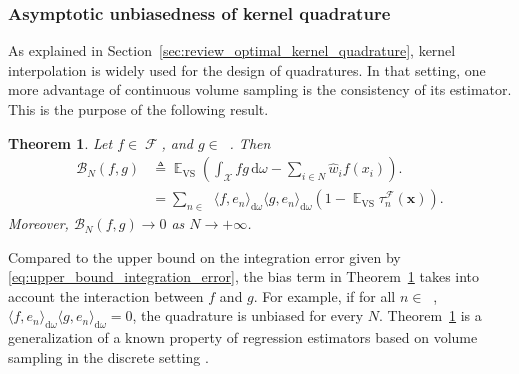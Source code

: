 \documentclass[twoside,11pt]{book}
\newtheorem{theorem}{Theorem}
\numberwithin{theorem}{chapter}
\numberwithin{definition}{chapter}
\numberwithin{proposition}{chapter}
\numberwithin{corollary}{chapter}
\numberwithin{example}{chapter}
\numberwithin{lemma}{chapter}
\DeclareMathOperator{\VS}{\mathrm{VS}}
\DeclareMathOperator{\EX}{\mathbb{E}}
\DeclareMathOperator{\F}{\mathcal{F}}
\DeclareMathOperator{\X}{\mathcal{X}}
\DeclareMathOperator{\Ltwo}{\mathbb{L}_{2}(\mathrm{d} \omega)}
\DeclareMathOperator{\Ns}{\mathbb{N}^{*}}
\newcommand{\pc}[1]{\textcolor{blue}{#1}}
\newcommand{\rb}[1]{\textcolor{magenta}{#1}}
\begin{document}
\subsubsection{Asymptotic unbiasedness of kernel quadrature}\label{sec:unbiased_property}
As explained in Section~\ref{sec:review_optimal_kernel_quadrature}, kernel interpolation is widely used for the design of quadratures.
In that setting, one more advantage of continuous volume sampling is the consistency of its estimator. This is the purpose of the following result.
 \begin{theorem}\label{thm:EX_VS_integration_error}
Let $f \in \F$, and $g \in \Ltwo$. Then
\begin{align}
\mathcal{B}_{N}(f,g) & \triangleq \EX_{\VS} \left( \int_{\X}fg\,\mathrm{d}\omega -  \sum\limits_{i \in N} \hat{w}_{i}f(x_{i}) \right). \nonumber\\
 & = \sum\limits_{n \in \Ns} \langle f,e_{n} \rangle_{\mathrm{d}\omega} \langle g,e_{n} \rangle_{\mathrm{d}\omega}\left(1- \EX_{\VS}\tau_{n}^{\F}(\bm{x}) \right) . %
\end{align}
Moreover,
$\mathcal{B}_{N}(f,g) \rightarrow 0$ as $N \rightarrow +\infty$.
\end{theorem}
Compared to the upper bound on the integration error given by \eqref{eq:upper_bound_integration_error}, the bias term in Theorem~\ref{thm:EX_VS_integration_error} takes into account the interaction between $f$ and $g$. For example, if for all $n \in \Ns$, $\langle f,e_{n} \rangle_{\mathrm{d}\omega} \langle g,e_{n} \rangle_{\mathrm{d}\omega} = 0$, the quadrature is unbiased for every $N$.
Theorem~\ref{thm:EX_VS_integration_error} is a generalization of a known property of regression estimators based on volume sampling in the discrete setting \citep{BeTe90,DeWa17,DeWaHs18,DeWaHs19}.
\end{document}
